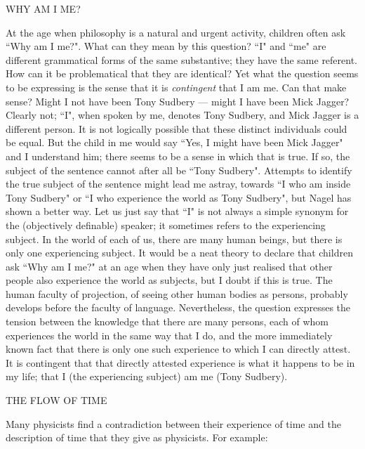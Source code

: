 \documentclass[12pt,a4paper,reqno]{article}
\renewcommand{\(}{\left(}
\renewcommand{\)}{\right)}
\newcommand{\<}{\langle}
\renewcommand{\>}{\rangle}
\theoremstyle{plain} %
\theoremstyle{definition}
\theoremstyle{remark}
\begin{document}
\goodbreak
\begin{center} WHY AM I ME? \end{center}

At the age when philosophy is a natural and urgent activity, children often ask
``Why am I me?". What can they mean by this question? ``I" and ``me" are
different grammatical forms of the same
substantive; they have the same referent. How can it be problematical
that they are identical? Yet what the question seems to be expressing is
the sense that it is \emph{contingent} that I am me. Can that make
sense? Might I not have been Tony Sudbery --- might I have been Mick
Jagger? Clearly not; ``I", when spoken by me, denotes Tony Sudbery, and
Mick Jagger is a different person. It is not logically possible that
these distinct individuals could be equal. But the child in me would say
``Yes, I might have been Mick Jagger" and I understand him; there seems
to be a
sense in which that is true. If so, the subject of the sentence cannot
after all be ``Tony Sudbery". Attempts to identify the true subject of
the sentence might lead me astray, towards ``I who am inside Tony
Sudbery" or ``I who experience the world as Tony Sudbery", but Nagel has
shown a better way. Let us just say that ``I" is not always a simple 
synonym for the (objectively definable) speaker; it sometimes refers to
the experiencing subject. In the world of each of us, there are many 
human beings, but there is only one experiencing subject. It would be a
neat theory to declare that children ask ``Why am I me?" at an age when
they have only just realised that other people also experience the world
as subjects, but I doubt if this is true. The human faculty of
projection, of seeing other human bodies as persons, probably develops before
the faculty of language. Nevertheless, the question
expresses the tension between the knowledge that there are many persons,
each of whom experiences the world in the same way that I do, and the
more immediately known fact that there is only one such experience to which
I can directly attest. It is contingent that that directly attested
experience is what it happens to be in my life; that I (the experiencing
subject) am me (Tony Sudbery).

\medskip
\begin{center} THE FLOW OF TIME \end{center}

Many physicists find a contradiction between their experience of time
and the description of time that they give as physicists. For example:
\end{document}
